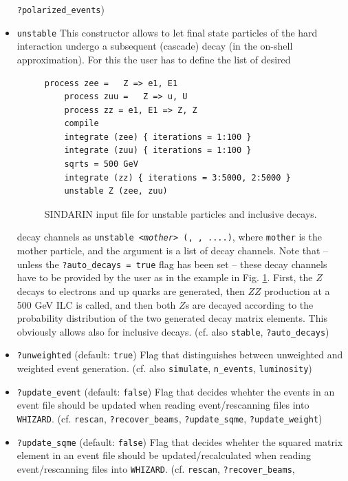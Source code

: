 \documentclass[12pt]{book}
\newcommand{\ttt}[1]{\texttt{#1}}
\newcommand{\whizard}{\texttt{WHIZARD}}
\begin{document}
\begin{itemize}
\ttt{?polarized\_events})
\item
\ttt{unstable} \newline
This constructor allows to let final state particles of the hard
interaction undergo a subsequent (cascade) decay (in the on-shell
approximation). For this the user has to define the list of desired
\begin{figure}
  \begin{Verbatim}[frame=single]
    process zee =   Z => e1, E1
    process zuu =   Z => u, U 
    process zz = e1, E1 => Z, Z
    compile
    integrate (zee) { iterations = 1:100 }
    integrate (zuu) { iterations = 1:100 }
    sqrts = 500 GeV
    integrate (zz) { iterations = 3:5000, 2:5000 }
    unstable Z (zee, zuu)
 \end{Verbatim}
  \caption{\label{fig:ex_unstable} SINDARIN input file for unstable
    particles and inclusive decays.}
\end{figure}
decay channels as \ttt{unstable {\em <mother>} ({\em <decay1>}, {\em <decay2>}, ....)},
where \ttt{mother} is the mother particle, and the argument is a list
of decay channels. Note that -- unless the \ttt{?auto\_decays = true}
flag has been set -- these decay channels have to be provided by the
user as  in the example in Fig. \ref{fig:ex_unstable}. First, the $Z$
decays to electrons and up quarks are generated, then $ZZ$ production
at a 500 GeV ILC is called, and then both $Z$s are decayed according
to the probability distribution of the two generated decay matrix 
elements. This obviously allows also for inclusive decays. 
(cf. also \ttt{stable}, \ttt{?auto\_decays})
\item
\ttt{?unweighted} \qquad (default: \ttt{true}) \newline
Flag that distinguishes between unweighted and weighted event
generation. (cf. also \ttt{simulate}, \ttt{n\_events},
\ttt{luminosity}) 
\item
\ttt{?update\_event} \qquad (default: \ttt{false}) \newline
Flag that decides whehter the events in an event file should be
updated when reading event/rescanning files into
\whizard. (cf. \ttt{rescan}, \ttt{?recover\_beams},
\ttt{?update\_sqme}, \ttt{?update\_weight}) 
\item
\ttt{?update\_sqme} \qquad (default: \ttt{false}) \newline
Flag that decides whehter the squared matrix element in an event file
should be updated/recalculated when reading event/rescanning files
into \whizard. (cf. \ttt{rescan}, \newline \ttt{?recover\_beams},

\end{itemize}
\end{document}
